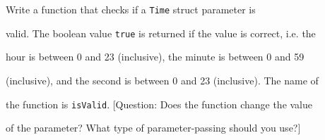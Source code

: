 Write a function that checks if a \texttt{Time} struct parameter is

valid. The boolean value \texttt{true} is returned if the value is correct, i.e. the

hour is between 0 and 23 (inclusive), the minute is between 0 and 59

(inclusive), and the second is between 0 and 23 (inclusive). The name of

the function is \texttt{isValid}. [Question: Does the function change the value

of the parameter? What type of parameter-passing should you use?]

